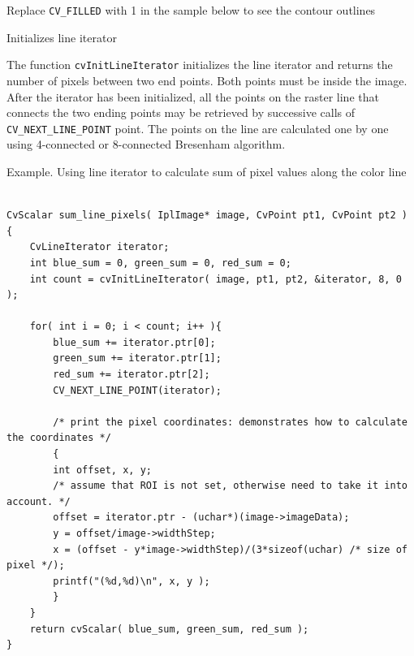 Replace \texttt{CV\_FILLED} with 1 in the sample below to see the contour outlines

\label{InitLineIterator}

Initializes line iterator


\begin{description}
\end{description}

The function \texttt{cvInitLineIterator} initializes the line
iterator and returns the number of pixels between two end points.
Both points must be inside the image. After the iterator has been
initialized, all the points on the raster line that connects the
two ending points may be retrieved by successive calls of
\texttt{CV\_NEXT\_LINE\_POINT} point. The points on the line are
calculated one by one using 4-connected or 8-connected Bresenham
algorithm.

Example. Using line iterator to calculate sum of pixel values along the color line

\begin{lstlisting}

CvScalar sum_line_pixels( IplImage* image, CvPoint pt1, CvPoint pt2 )
{
    CvLineIterator iterator;
    int blue_sum = 0, green_sum = 0, red_sum = 0;
    int count = cvInitLineIterator( image, pt1, pt2, &iterator, 8, 0 );

    for( int i = 0; i < count; i++ ){
        blue_sum += iterator.ptr[0];
        green_sum += iterator.ptr[1];
        red_sum += iterator.ptr[2];
        CV_NEXT_LINE_POINT(iterator);

        /* print the pixel coordinates: demonstrates how to calculate the coordinates */
        {
        int offset, x, y;
        /* assume that ROI is not set, otherwise need to take it into account. */
        offset = iterator.ptr - (uchar*)(image->imageData);
        y = offset/image->widthStep;
        x = (offset - y*image->widthStep)/(3*sizeof(uchar) /* size of pixel */);
        printf("(%d,%d)\n", x, y );
        }
    }
    return cvScalar( blue_sum, green_sum, red_sum );
}

\end{lstlisting}


